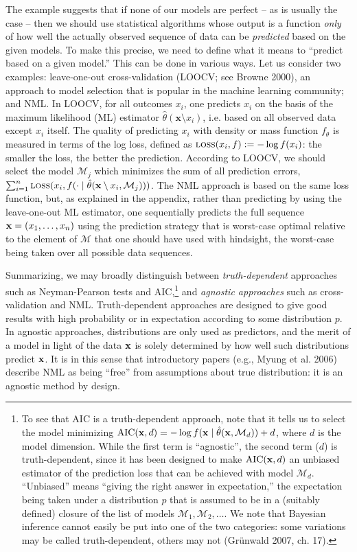 \documentclass[authoryear]{elsarticle}
\newcommand{\loss}{\mbox{\sc loss}}
\newcommand{\model}{\mathcal{M}}
\newcommand{\leaveout}[2]{\mathbf{#1} \setminus {#1}_{#2}}
\begin{document}
The example suggests that if none of
our models are perfect -- as is usually the case -- then we should
use statistical algorithms whose output is a function {\em only\/} of how well the
actually observed sequence of data can be {\em predicted\/} based on
the given models. To make this precise, we need to define what it
means to ``predict based on a given model.'' This can be done in
various ways.  Let us consider two examples: leave-one-out
cross-validation (LOOCV; see Browne 2000), an approach to
model selection that is popular
in the machine learning community; and NML. In LOOCV, for all outcomes
$x_i$, one predicts $x_i$ on the basis of the maximum likelihood (ML)
estimator $\hat{\theta}(\leaveout{x}{i})$, i.e. based on all
observed data except $x_i$ itself. The quality of predicting $x_i$
with density or mass function $f_{\theta}$ is measured in terms of the
log loss, defined as $\loss(x_i,f) := - \log f(x_i)$: the smaller the
loss, the better the prediction. According to LOOCV,
we should select the model $\model_j$ which minimizes the sum of all
prediction errors, $\sum_{i=1}^n \loss(x_i,f(\cdot \mid
\hat{\theta}(\leaveout{x}{i}, \model_j)))$. The NML approach is
based on the same loss function, but, as explained in the
appendix, rather than predicting by using the
leave-one-out ML estimator, one sequentially predicts the full
sequence ${\bf x} = (x_1, \ldots, x_n)$ using the prediction strategy
that is worst-case optimal relative to the element of $\model$ that
one should have used with hindsight, the worst-case being taken over
all possible data sequences.

Summarizing, we may broadly distinguish between {\em
  truth-dependent\/} approaches such as Neyman-Pearson tests and
  AIC,\footnote{To see that AIC is a
truth-dependent approach, note that it tells us to select the model
minimizing $\mbox{AIC}({\bf x},d) = - \log f({\bf x} \mid
\hat{\theta}({\bf x}, \model_d)) + d$, where $d$ is the model
dimension. While the first term is ``agnostic'', the second term ($d$)
is truth-dependent, since it has been designed to make
$\mbox{AIC}({\bf x},d)$ an unbiased estimator of the prediction
loss that can be achieved with model $\model_d$. ``Unbiased''
means ``giving the right answer in expectation,'' the expectation
being taken under a distribution $p$ that is assumed to be in a
(suitably defined) closure of the list of models $\model_1, \model_2,
\ldots$.  We note that Bayesian inference cannot easily be put into
one of the two categories: some variations may be called
truth-dependent, others may not (Gr\"unwald 2007, ch. 17).}
  and
{\em agnostic approaches\/} such as cross-validation and NML.
Truth-dependent approaches are designed to give good results with high
probability or in expectation according to some distribution $p$. In
agnostic approaches, distributions are only used as predictors, and
the merit of a model in light of the data $\bf x$ is solely determined
by how well such distributions predict $\bf x$. It is in this sense that
introductory papers (e.g., Myung et al. 2006) describe NML as being
``free'' from assumptions about true distribution: it is an agnostic
method by design.
\end{document}
